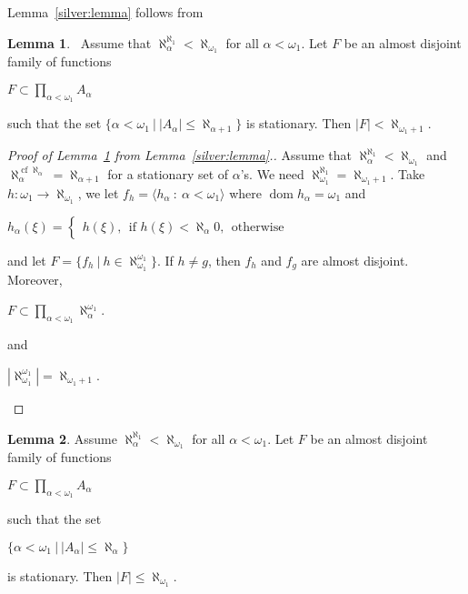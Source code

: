 \documentclass[8pt]{article}
\theoremstyle{definition}
\theoremstyle{definition}
\theoremstyle{definition}
\theoremstyle{definition}
\theoremstyle{definition}
\theoremstyle{definition}
\theoremstyle{definition}
\theoremstyle{definition}
\newtheorem{lemma}{Lemma}[section]
\theoremstyle{definition}
\theoremstyle{definition}
\theoremstyle{definition}
\theoremstyle{definition}
\theoremstyle{definition}
\theoremstyle{definition}
\theoremstyle{question}
\begin{document}
Lemma~\ref{silver:lemma} follows from
\begin{lemma}~\label{silver:lemma:2}
  Assume that $\aleph^{\aleph_1}_{\alpha} < \aleph_{\omega_1}$ for all $\alpha < \omega_1$. Let $F$
  be an almost disjoint family of functions
  \begin{center}
    $F \subset \prod \limits_{\alpha < \omega_1} A_{\alpha}$
  \end{center}
  such that the set $\{ \alpha < \omega_1 \: | \: |A_{\alpha}| \leq \aleph_{\alpha + 1}\}$ is stationary.
  Then $|F| < \aleph_{\omega_1 + 1}$.
\end{lemma}
\begin{proof}[Proof of Lemma~\ref{silver:lemma:2} from Lemma~\ref{silver:lemma}.]

  Assume that $\aleph^{\aleph_1}_{\alpha} < \aleph_{\omega_1}$ and 
  $\aleph^{\operatorname{cf} \aleph_{\alpha}}_{\alpha} = \aleph_{\alpha + 1}$ for a stationary set of $\alpha$'s.
  We need $\aleph^{\aleph_1}_{\omega_1} = \aleph_{\omega_1 + 1}$.
  Take $h : \omega_1 \to \aleph_{\omega_1}$, we let $f_h = \langle h_{\alpha} \: : \: \alpha < \omega_1 \rangle$
  where $\operatorname{dom} h_{\alpha} = \omega_1$ and
  \begin{center}
    $h_{\alpha}(\xi) = \begin{cases}
      h(\xi), \:\: \text{if $h(\xi) < \aleph_{\alpha}$}
      0, \:\: \text{otherwise}
    \end{cases}$
  \end{center}
  and let $F = \{ f_h \: | \: h \in \aleph_{\omega_1}^{\omega_1}\}$. If $h \neq g$, then $f_h$ and $f_g$ are almost disjoint.
  Moreover, 
  \begin{center}
    $F \subset \prod \limits_{\alpha < \omega_1} \aleph_{\alpha}^{\omega_1}$.
  \end{center}
  and
  \begin{center}
    $|\aleph_{\omega_1}^{\omega_1}| = \aleph_{\omega_1+1}$.
  \end{center}
\end{proof}

\begin{lemma}
  Assume $\aleph_{\alpha}^{\aleph_1} < \aleph_{\omega_1}$ for all $\alpha < \omega_1$. Let $F$ be an almost disjoint
  family of functions
  \begin{center}
    $F \subset \prod \limits_{\alpha < \omega_1} A_{\alpha}$
  \end{center}
  such that the set
  \begin{center}
    $\{ \alpha < \omega_1 \: | \: |A_{\alpha}| \leq \aleph_{\alpha}\}$
  \end{center}
  is stationary. Then $|F| \leq \aleph_{\omega_1}$.
\end{lemma}
\end{document}

